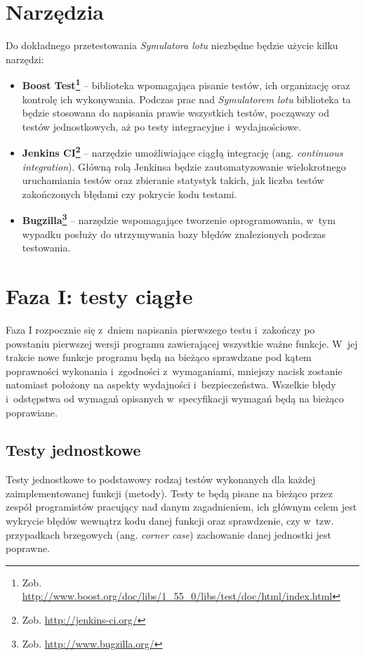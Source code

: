 \documentclass{mwrep}
\begin{document}
\chapter{Narzędzia}
Do dokładnego przetestowania \textit{Symulatora lotu} niezbędne będzie użycie kilku narzędzi:
\begin{itemize}
\item \textbf{Boost Test\footnote{Zob. \url{http://www.boost.org/doc/libs/1\_55\_0/libs/test/doc/html/index.html}}} -- biblioteka  wpomagająca pisanie testów, ich organizację oraz kontrolę ich wykonywania. Podczas prac nad \textit{Symulatorem lotu} biblioteka ta będzie stosowana do napisania prawie wszystkich testów, począwszy od testów jednostkowych, aż po testy integracyjne i~wydajnościowe.
\item \textbf{Jenkins CI\footnote{Zob. \url{http://jenkins-ci.org/}}} -- narzędzie umożliwiające ciągłą integrację (ang. \textit{continuous integration}). Główną rolą Jenkinsa będzie zautomatyzowanie wielokrotnego uruchamiania testów oraz zbieranie statystyk takich, jak liczba testów zakończonych błędami czy pokrycie kodu testami.
\item \textbf{Bugzilla\footnote{Zob. \url{http://www.bugzilla.org/}}} -- narzędzie wspomagające tworzenie oprogramowania, w~tym wypadku posłuży do utrzymywania bazy błędów znalezionych podczas testowania.
\end{itemize}

\chapter{Faza I: testy ciągłe}
Faza I rozpocznie się z~dniem napisania pierwszego testu i~zakończy po powstaniu pierwszej wersji programu zawierającej wszystkie ważne funkcje. W~jej trakcie nowe funkcje programu będą na bieżąco sprawdzane pod kątem poprawności wykonania i~zgodności z~wymaganiami, mniejszy nacisk zostanie natomiast położony na aspekty wydajności i~bezpieczeństwa. Wszelkie błędy i~odstępstwa od wymagań opisanych w~specyfikacji wymagań będą na bieżąco poprawiane.

\section{Testy jednostkowe}
Testy jednostkowe to podstawowy rodzaj testów wykonanych dla każdej zaimplementowanej funkcji (metody). Testy te będą pisane na bieżąco przez zespół programistów pracujący nad danym zagadnieniem, ich głównym celem jest wykrycie błędów wewnątrz kodu danej funkcji oraz sprawdzenie, czy w~tzw. przypadkach brzegowych (ang. \textit{corner case}) zachowanie danej jednostki jest poprawne.
\end{document}
